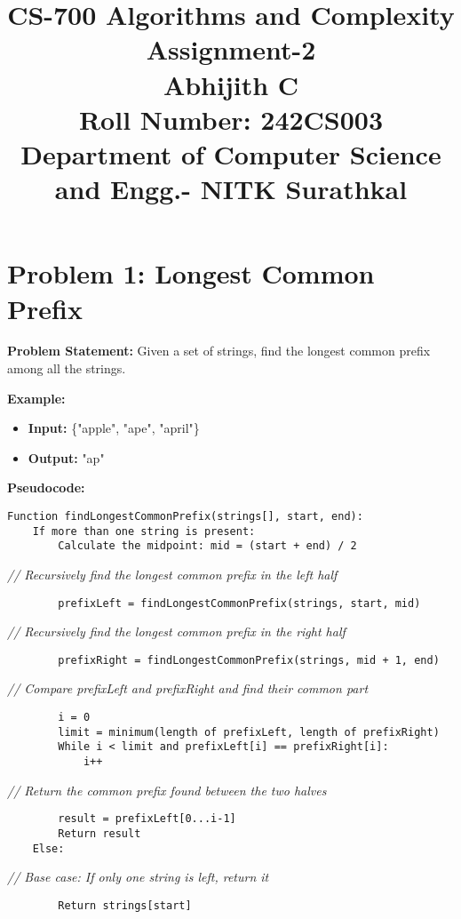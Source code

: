 \documentclass[a4paper,12pt]{report}
\title{
  \vspace{-2em} %
  \textbf{CS-700 Algorithms and Complexity} \\ %
  \large \textbf{Assignment-2} \\ %
  \vspace{1em} %
  \textbf{Abhijith C} \\ %
  Roll Number: 242CS003 \\%
  Department of Computer Science and Engg.- NITK Surathkal
}
\author{} %
\date{} %
\begin{document}
\maketitle

\section*{Problem 1: Longest Common Prefix}

\large \textbf{Problem Statement:}  
Given a set of strings, find the longest common prefix among all the strings.  

\textbf{Example:}
\begin{itemize}
    \item \textbf{Input:} \{"apple", "ape", "april"\}
    \item \textbf{Output:} "ap"
\end{itemize}

\textbf{Pseudocode:}

\begin{tcolorbox}[colback=white, colframe=black, boxrule=0.5pt] %
\ttfamily\small  %
\begin{verbatim}
Function findLongestCommonPrefix(strings[], start, end):
    If more than one string is present:
        Calculate the midpoint: mid = (start + end) / 2
\end{verbatim}
\textit{\color{gray} // Recursively find the longest common prefix in the left half}
\begin{verbatim}
        prefixLeft = findLongestCommonPrefix(strings, start, mid)
\end{verbatim}
\textit{\color{gray} // Recursively find the longest common prefix in the right half}
\begin{verbatim}
        prefixRight = findLongestCommonPrefix(strings, mid + 1, end)
\end{verbatim}
\textit{\color{gray} // Compare prefixLeft and prefixRight and find their common part}
\begin{verbatim}
        i = 0
        limit = minimum(length of prefixLeft, length of prefixRight)
        While i < limit and prefixLeft[i] == prefixRight[i]:
            i++
\end{verbatim}
\textit{\color{gray} // Return the common prefix found between the two halves}
\begin{verbatim}
        result = prefixLeft[0...i-1]
        Return result
    Else:
\end{verbatim}
\textit{\color{gray} // Base case: If only one string is left, return it}
\begin{verbatim}
        Return strings[start]
\end{verbatim}
\end{tcolorbox}
\end{document}
